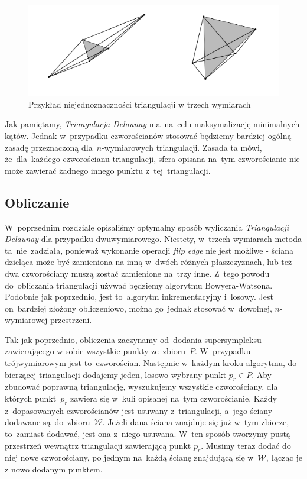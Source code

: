 \documentclass[skorowidz,autorrok,backref,xodstep,oswiadczenie]{wmimgr}
\begin{document}
\begin{figure}[ht!]
\centering
\includegraphics[width=150mm]{images/triangulacja_3d.png}
\caption{Przykład niejednoznaczności triangulacji w trzech wymiarach}
\label{triangulation3d}
\end{figure}

Jak pamiętamy, \emph{Triangulacja Delaunay} ma~na~celu maksymalizację minimalnych kątów. Jednak w~przypadku czworościanów stosować będziemy bardziej ogólną zasadę przeznaczoną dla~$n$-wymiarowych triangulacji. Zasada ta mówi, że~dla~każdego czworościanu triangulacji, sfera opisana na~tym czworościanie nie może zawierać żadnego innego punktu z~tej~triangulacji.

\subsection{Obliczanie}

W~poprzednim rozdziale opisaliśmy optymalny sposób wyliczania \emph{Triangulacji Delaunay} dla przypadku dwuwymiarowego. Niestety, w~trzech wymiarach metoda ta~nie~zadziała, ponieważ wykonanie operacji \emph{flip edge} nie jest możliwe - ściana dzieląca może być zamieniona na inną w~dwóch różnych płaszczyznach, lub też dwa czworościany muszą zostać zamienione na~trzy inne. Z~tego powodu do~obliczania triangulacji używać będziemy algorytmu Bowyera-Watsona. Podobnie jak poprzednio, jest to~algorytm inkrementacyjny i~losowy. Jest on~bardziej złożony obliczeniowo, można go~jednak stosować w~dowolnej, $n$-wymiarowej przestrzeni.

Tak jak poprzednio, obliczenia zaczynamy od~dodania supersympleksu zawierającego w sobie wszystkie punkty ze~zbioru~$P$. W~przypadku trójwymiarowym jest to~czworościan. Następnie w~każdym kroku algorytmu, do bierzącej triangulacji dodajemy jeden, losowo wybrany punkt $p_{r} \in P$. Aby zbudować poprawną triangulację, wyszukujemy wszystkie czworościany, dla których punkt~$p_{r}$ zawiera się w~kuli opisanej na~tym czworościanie. Każdy z~dopasowanych czworościanów jest usuwany z~triangulacji, a~jego ściany dodawane są~do~zbioru~$\mathcal{W}$. Jeżeli dana ściana znajduje się już w~tym zbiorze, to~zamiast dodawać, jest ona z~niego usuwana. W~ten sposób tworzymy pustą przestrzeń wewnątrz triangulacji zawierającą punkt $p_{r}$. Musimy teraz dodać do niej nowe czworościany, po jednym na~każdą ścianę znajdującą się w~$\mathcal{W}$, łącząc je z nowo dodanym punktem.
\end{document}
